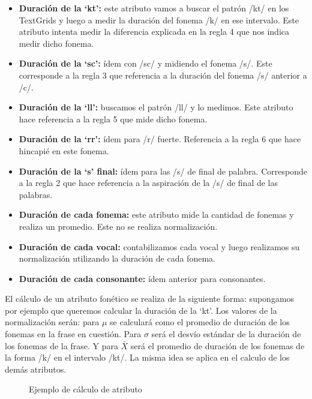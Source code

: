 \begin{itemize}
    \item \textbf{Duración de la `kt’:} este atributo vamos a buscar el patrón /kt/ en los TextGrids y luego a medir la duración del fonema /k/ en ese intervalo. Este atributo intenta medir la diferencia explicada en la regla 4 que nos indica medir dicho fonema.
    \item \textbf{Duración de la `sc’:} ídem con /sc/ y midiendo el fonema /s/. Este corresponde a la regla 3 que referencia a la duración del fonema /s/ anterior a /c/.  
    \item \textbf{Duración de la `ll’:} buscamos el patrón /ll/ y lo medimos. Este atributo hace referencia a la regla 5 que mide dicho fonema.
    \item \textbf{Duración de la `rr’:} ídem para /r/ fuerte. Referencia a la regla 6 que hace hincapié en este fonema.
    \item \textbf{Duración de la `s’ final:} ídem para las /s/ de final de palabra. Corresponde a la regla 2 que hace referencia a la aspiración de la /s/ de final de las palabras.  
    \item \textbf{Duración de cada fonema:} este atributo mide la cantidad de fonemas y realiza un promedio. Este no se realiza normalización.  
    \item \textbf{Duración de cada vocal:} contabilizamos cada vocal y luego realizamos su normalización utilizando la duración de cada fonema.
    \item \textbf{Duración de cada consonante:} ídem anterior para consonantes. 
\end{itemize}

El cálculo de un atributo fonético se realiza de la siguiente forma: supongamos por ejemplo que queremos calcular la duración de la `kt’. Los valores de la normalización serán: para $\mu$ se calculará como el promedio de duración de los fonemas en la frase en cuestión. Para $\sigma$ será el desvío estándar de la duración de los fonemas de la frase. Y para $\bar{X}$ será el promedio de duración de los fonemas de la forma /k/ en el intervalo /kt/. La misma idea se aplica en el calculo de los demás atributos.

\begin{figure}[H]
\centering
{}
\caption{Ejemplo de cálculo de atributo}
\label{ejemploAtribFon}
\end{figure}

